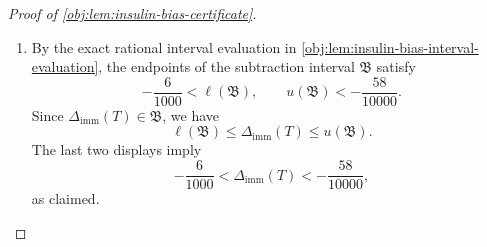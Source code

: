 \begin{proof}[Proof of \cref{obj:lem:insulin-bias-certificate}]
\begin{enumerate}
\item By the exact rational interval evaluation in \cref{obj:lem:insulin-bias-interval-evaluation}, the endpoints of the subtraction interval \(\mathfrak B\) satisfy
\[
-\frac{6}{1000}<\ell(\mathfrak B),
\qquad
u(\mathfrak B)<-\frac{58}{10000}.
\]
Since \(\Delta_{\mathrm{imm}}(T)\in\mathfrak B\), we have
\[
\ell(\mathfrak B)
\le
\Delta_{\mathrm{imm}}(T)
\le
u(\mathfrak B).
\]
The last two displays imply
\[
-\frac{6}{1000}
<
\Delta_{\mathrm{imm}}(T)
<
-\frac{58}{10000},
\]
as claimed. %
\end{enumerate}
\end{proof}
